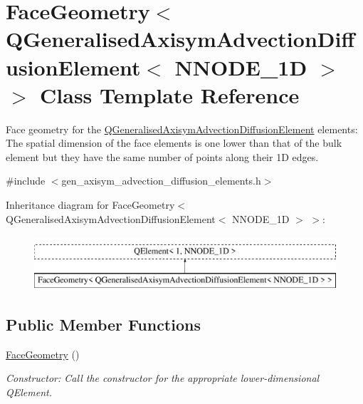 \hypertarget{classFaceGeometry_3_01QGeneralisedAxisymAdvectionDiffusionElement_3_01NNODE__1D_01_4_01_4}{}\section{Face\+Geometry$<$ Q\+Generalised\+Axisym\+Advection\+Diffusion\+Element$<$ N\+N\+O\+D\+E\+\_\+1D $>$ $>$ Class Template Reference}
\label{classFaceGeometry_3_01QGeneralisedAxisymAdvectionDiffusionElement_3_01NNODE__1D_01_4_01_4}


Face geometry for the \hyperlink{classQGeneralisedAxisymAdvectionDiffusionElement}{Q\+Generalised\+Axisym\+Advection\+Diffusion\+Element} elements\+: The spatial dimension of the face elements is one lower than that of the bulk element but they have the same number of points along their 1D edges.  




{\ttfamily \#include $<$gen\+\_\+axisym\+\_\+advection\+\_\+diffusion\+\_\+elements.\+h$>$}

Inheritance diagram for Face\+Geometry$<$ Q\+Generalised\+Axisym\+Advection\+Diffusion\+Element$<$ N\+N\+O\+D\+E\+\_\+1D $>$ $>$\+:\begin{figure}[H]
\begin{center}
\leavevmode
\includegraphics[height=2.000000cm]{classFaceGeometry_3_01QGeneralisedAxisymAdvectionDiffusionElement_3_01NNODE__1D_01_4_01_4}
\end{center}
\end{figure}
\subsection*{Public Member Functions}
\begin{DoxyCompactItemize}
\item 
\hyperlink{classFaceGeometry_3_01QGeneralisedAxisymAdvectionDiffusionElement_3_01NNODE__1D_01_4_01_4_aea6b844788ae63f199b4fb1e0b6d976c}{Face\+Geometry} ()
\begin{DoxyCompactList}\small\item\em Constructor\+: Call the constructor for the appropriate lower-\/dimensional Q\+Element. \end{DoxyCompactList}\end{DoxyCompactItemize}


